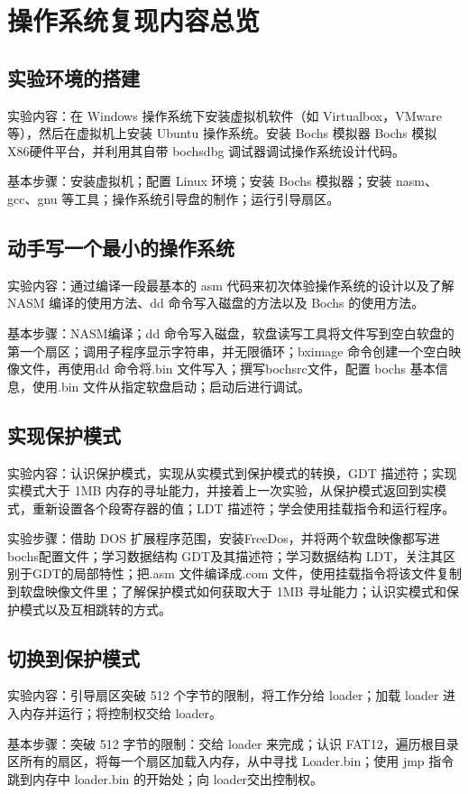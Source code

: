 \chapter{操作系统复现内容总览}

\section{实验环境的搭建}
实验内容：在 Windows 操作系统下安装虚拟机软件（如 Virtualbox，VMware等），然后在虚拟机上安装 Ubuntu 操作系统。安装 Bochs 模拟器 Bochs 模拟 X86硬件平台，并利用其自带 bochsdbg 调试器调试操作系统设计代码。\par
基本步骤：安装虚拟机；配置 Linux 环境；安装 Bochs 模拟器；安装 nasm、gcc、gnu 等工具；操作系统引导盘的制作；运行引导扇区。


\section{动手写一个最小的操作系统}
实验内容：通过编译一段最基本的 asm 代码来初次体验操作系统的设计以及了解 NASM 编译的使用方法、dd 命令写入磁盘的方法以及 Bochs 的使用方法。\par
基本步骤：NASM编译；dd 命令写入磁盘，软盘读写工具将文件写到空白软盘的第一个扇区；调用子程序显示字符串，并无限循环；bximage 命令创建一个空白映像文件，再使用dd 命令将.bin 文件写入；撰写bochsrc文件，配置 bochs 基本信息，使用.bin 文件从指定软盘启动；启动后进行调试。


\section{实现保护模式}
实验内容：认识保护模式，实现从实模式到保护模式的转换，GDT 描述符；实现实模式大于 1MB 内存的寻址能力，并接着上一次实验，从保护模式返回到实模式，重新设置各个段寄存器的值；LDT 描述符；学会使用挂载指令和运行程序。\par
实验步骤：借助 DOS 扩展程序范围，安装FreeDos，并将两个软盘映像都写进bochs配置文件；学习数据结构 GDT及其描述符；学习数据结构 LDT，关注其区别于GDT的局部特性；把.asm 文件编译成.com 文件，使用挂载指令将该文件复制到软盘映像文件里；了解保护模式如何获取大于 1MB 寻址能力；认识实模式和保护模式以及互相跳转的方式。

\section{切换到保护模式}
实验内容：引导扇区突破 512 个字节的限制，将工作分给 loader；加载 loader 进入内存并运行；将控制权交给 loader。\par
基本步骤：突破 512 字节的限制：交给 loader 来完成；认识 FAT12，遍历根目录区所有的扇区，将每一个扇区加载入内存，从中寻找 Loader.bin；使用 jmp 指令跳到内存中 loader.bin 的开始处；向 loader交出控制权。

